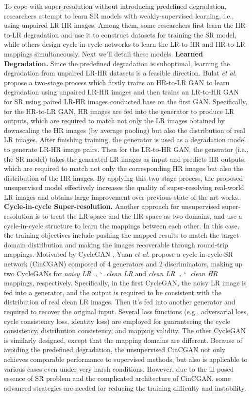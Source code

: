 {To cope with super-resolution without introducing predefined degradation, researchers attempt to learn SR models with weakly-supervised learning, i.e., using unpaired LR-HR images.
Among them, some researchers first learn the HR-to-LR degradation and use it to construct datasets for training the SR model, while others design cycle-in-cycle networks to learn the LR-to-HR and HR-to-LR mappings simultaneously.
Next we'll detail these models.
\textbf{Learned Degradation.}
Since the predefined degradation is suboptimal, learning the degradation from unpaired LR-HR datasets is a feasible direction.
Bulat \textit{et al.}  propose a two-stage process which firstly trains an HR-to-LR GAN to learn degradation using unpaired LR-HR images and then trains an LR-to-HR GAN for SR using paired LR-HR images conducted base on the first GAN.
Specifically, for the HR-to-LR GAN, HR images are fed into the generator to produce LR outputs, which are required to match not only the LR images obtained by downscaling the HR images (by average pooling) but also the distribution of real LR images.
After finishing training, the generator is used as a degradation model to generate LR-HR image pairs.
Then for the LR-to-HR GAN, the generator (i.e., the SR model) takes the generated LR images as input and predicts HR outputs, which are required to match not only the corresponding HR images but also the distribution of the HR images.
By applying this two-stage process, the proposed unsupervised model effectively increases the quality of super-resolving real-world LR images and obtains large improvement over previous state-of-the-art works.
\textbf{Cycle-in-cycle Super-resolution.}
Another approach for unsupervised super-resolution is to treat the LR space and the HR space as two domains, and use a cycle-in-cycle structure to learn the mappings between each other.
In this case, the training objectives include pushing the mapped results to match the target domain distribution and making the images recoverable through round-trip mappings.
Motivated by CycleGAN , Yuan \textit{et al.}  propose a cycle-in-cycle SR network (CinCGAN) composed of 4 generators and 2 discriminators, making up two CycleGANs for \textit{noisy LR} $\rightleftharpoons$ \textit{clean LR} and \textit{clean LR} $\rightleftharpoons$ \textit{clean HR} mappings, respectively.
Specifically, in the first CycleGAN, the noisy LR image is fed into a generator, and the output is required to be consistent with the distribution of real clean LR images.
Then it's fed into another generator and required to recover the original input.
Several loss functions (e.g., adversarial loss, cycle consistency loss, identity loss) are employed for guaranteeing the cycle consistency, distribution consistency, and mapping validity.
The other CycleGAN is similarly designed, except that the mapping domains are different.
Because of avoiding the predefined degradation, the unsupervised CinCGAN not only achieves comparable performance to supervised methods, but also is applicable to various cases even under very harsh conditions.
However, due to the ill-posed essence of SR problem and the complicated architecture of CinCGAN, some advanced strategies are needed for reducing the training difficulty and instability.

}

